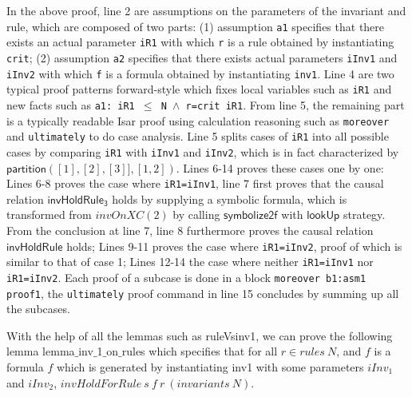 \documentclass[final]{IEEEtran}
\def \iInv {iInv}
\def \iR {iR}
\begin{document}
In the above proof, line 2 are assumptions on the parameters of the invariant and rule, which are composed of two parts: (1) assumption {\tt a1} specifies that there exists an actual parameter {\tt \iR1} with which {\tt r} is a rule obtained by instantiating {\tt crit}; (2) assumption {\tt a2} specifies that  there exists   actual parameters {\tt \iInv1} and {\tt \iInv2} with which {\tt f} is a formula obtained by instantiating {\tt inv1}.
Line 4 are two typical  proof patterns forward-style which fixes local variables such as {\tt \iR1} and new facts such as {\tt a1: iR1 $\le$ N $\wedge$ r=crit \iR1}. From line 5, the remaining part  is a typically readable Isar proof using calculation
reasoning such as {\tt moreover} and {\tt ultimately} to do  case analysis.
Line 5 splits cases of {\tt iR1} into all possible cases by comparing
{\tt \iR1} with {\tt \iInv1} and {\tt \iInv2}, which is in fact characterized by $\mathsf{partition}([1],[2],[3]],[1,2])$. Lines 6-14  proves    these cases one by one: Lines 6-8 proves the case where {\tt iR1=\iInv1}, line 7 first proves that the causal relation $\mathsf{invHoldRule_3}$ holds by supplying a symbolic formula, which is transformed from $invOnXC(2)$  by calling $\mathsf{symbolize2f}$ with $\mathsf{lookUp}$ strategy.  %
From the conclusion at line 7, line 8 furthermore proves the causal relation $\mathsf{invHoldRule}$  holds; Lines 9-11 proves the case where {\tt iR1=\iInv2}, proof of which is similar to that of case 1; Lines 12-14 the case   where neither {\tt iR1=\iInv1} nor {\tt iR1=\iInv2}. Each proof of a subcase is done in a block {\tt moreover b1:asm1 proof1}, the {\tt ultimately}  proof command in line 15 concludes by summing up all the subcases.



With the help of all the lemmas such as {\sf ruleVsinv1},  we can prove the following lemma  {\sf lemma$\_$inv$\_$1$\_$on$\_$rules} which
specifies that for all $r \in rules ~N$, and $f$ is a formula $f$ which is generated by instantiating inv1 with some parameters $\iInv_1$ and $iInv_2$, $invHoldForRule ~s~ f~ r~ (invariants~ N)$.
\end{document}
